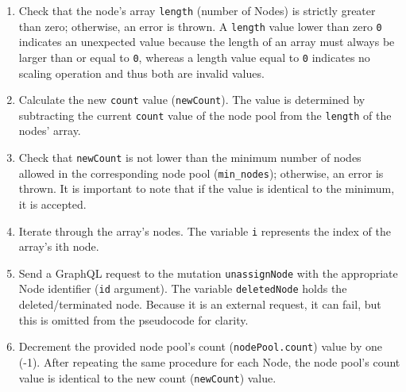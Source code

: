 \begin{enumerate}[label=\protect\circled{\arabic{*}}]
  \item Check that the node's array \texttt{length} (number of Nodes) is
    strictly greater than zero; otherwise, an error is thrown.
    \newline
    A \texttt{length} value lower than zero \texttt{0} indicates an unexpected value
    because the length of an array must always be larger than or equal to \texttt{0},
    whereas a length value equal to \texttt{0} indicates no scaling operation
    and thus both are invalid values.

  \item Calculate the new \texttt{count} value (\texttt{newCount}).
    \newline
    The value is determined by subtracting the current \texttt{count} value of the
    node pool from the \texttt{length} of the nodes' array.

  \item Check that \texttt{newCount} is not lower than the minimum number of
    nodes allowed in the corresponding node pool (\texttt{min\_nodes});
    otherwise, an error is thrown.
    \newline
    It is important to note that if the value is identical to the minimum, it is
    accepted.

  \item Iterate through the array's nodes.
    \newline
    The variable \texttt{i} represents the index of the array's ith node.

  \item Send a GraphQL request to the mutation \texttt{unassignNode} with the
    appropriate Node identifier (\texttt{id} argument). The variable \texttt{deletedNode}
    holds the deleted/terminated node.
    \newline
    Because it is an external request, it can fail, but this is omitted from the
    pseudocode for clarity.

  \item Decrement the provided node pool's count (\texttt{nodePool.count}) value
    by one (-1).
    \newline
    After repeating the same procedure for each Node, the node pool's count value
    is identical to the new count (\texttt{newCount}) value.
\end{enumerate}

